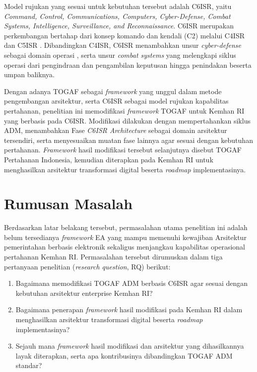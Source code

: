 Model rujukan yang sesuai untuk kebutuhan tersebut adalah C6ISR, yaitu \textit{Command, Control, Communications, Computers, Cyber-Defense, Combat Systems, Intelligence, Surveillance, and Reconnaissance}. C6ISR merupakan perkembangan bertahap dari konsep komando dan kendali (C2) melalui C4ISR dan C5ISR \cite{Petrovski2023,Todorovic2025}. Dibandingkan C4ISR, C6ISR menambahkan unsur \textit{cyber-defense} sebagai domain operasi \cite{NATO2016Warsaw}, serta unsur \textit{combat systems} yang melengkapi siklus operasi dari pengindraan dan pengambilan keputusan hingga penindakan beserta umpan baliknya.

Dengan adanya TOGAF sebagai \textit{framework} yang unggul dalam metode pengembangan arsitektur, serta C6ISR sebagai model rujukan kapabilitas pertahanan, penelitian ini memodifikasi \textit{framework} TOGAF untuk Kemhan RI yang berbasis pada C6ISR. Modifikasi dilakukan dengan mempertahankan siklus ADM, menambahkan Fase \textit{C6ISR Architecture} sebagai domain arsitektur tersendiri, serta menyesuaikan muatan fase lainnya agar sesuai dengan kebutuhan pertahanan. \textit{Framework} hasil modifikasi tersebut selanjutnya disebut TOGAF Pertahanan Indonesia, kemudian diterapkan pada Kemhan RI untuk menghasilkan arsitektur transformasi digital beserta \textit{roadmap} implementasinya.

\section{Rumusan Masalah}
\label{sec:I.2}

Berdasarkan latar belakang tersebut, permasalahan utama penelitian ini adalah belum tersedianya \textit{framework} EA yang mampu memenuhi kewajiban Arsitektur pemerintahan berbasis elektronik sekaligus menjangkau kapabilitas operasional pertahanan Kemhan RI. Permasalahan tersebut dirumuskan dalam tiga pertanyaan penelitian (\textit{research question}, RQ) berikut:
\begin{enumerate}[label=RQ\arabic*:, leftmargin=*]
\item Bagaimana memodifikasi TOGAF ADM berbasis C6ISR agar sesuai dengan kebutuhan arsitektur enterprise Kemhan RI?
\item Bagaimana penerapan \textit{framework} hasil modifikasi pada Kemhan RI dalam menghasilkan arsitektur transformasi digital beserta \textit{roadmap} implementasinya?
\item Sejauh mana \textit{framework} hasil modifikasi dan arsitektur yang dihasilkannya layak diterapkan, serta apa kontribusinya dibandingkan TOGAF ADM standar?
\end{enumerate}

